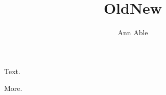 \documentclass{amsart}
\begin{document}
\title{Old}
\maketitle
Text.
\title{New}
\author{Ann Able}
\address{University X, Town}
\maketitle
More.
\end{document}
